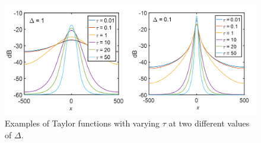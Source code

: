 \begin{figure}[h]
\begin{centering}
\includegraphics[scale=0.5]{fig_TD_plot.png}
\par\end{centering}
\caption{Examples of Taylor functions with varying $\tau$ at two different values of $\Delta$.}
\label{fig:TD_plot}
\end{figure}



